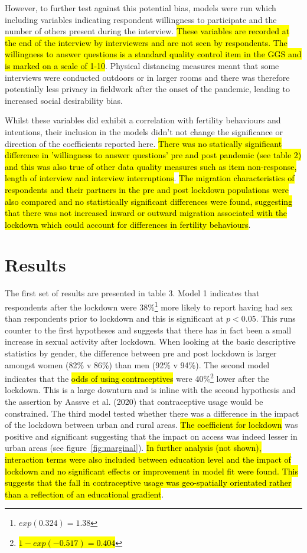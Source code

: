 \documentclass[10pt,letterpaper]{article}
\begin{document}
However, to further test against this potential bias, models were run which including variables indicating respondent willingness to participate and the number of others present during the interview. \hl{These variables are recorded at the end of the interview by interviewers and are not seen by respondents. The willingness to answer questions is a standard quality control item in the GGS and is marked on a scale of 1-10}. Physical distancing measures meant that some interviews were conducted outdoors or in larger rooms and there was therefore potentially less privacy in fieldwork after the onset of the pandemic, leading to increased social desirability bias. 

Whilst these variables did exhibit a correlation with fertility behaviours and intentions, their inclusion in the models didn't not change the significance or direction of the coefficients reported here. \hl{There was no statically significant difference in 'willingness to answer questions' pre and post pandemic (see table 2) and this was also true of other data quality measures such as item non-response, length of interview and interview interruptions}. \hl{The migration characteristics of respondents and their partners in the pre and post lockdown populations were also compared and no statistically significant differences were found, suggesting that there was not increased inward or outward migration associated with the lockdown which could account for differences in fertility behaviours}.
\newpage

\section*{Results} \label{sec:result}

The first set of results are presented in table 3. Model 1 indicates that respondents after the lockdown were 38\%\footnote{$exp(0.324) = 1.38$} more likely to report having had sex than respondents prior to lockdown and this is significant at $p < 0.05$. This runs counter to the first hypotheses and suggests that there has in fact been a small increase in sexual activity after lockdown. When looking at the basic descriptive statistics by gender, the difference between pre and post lockdown is larger amongst women (82\% v 86\%) than men (92\% v 94\%). 
The second model indicates that the \hl{odds of using contraceptives} were 40\%\footnote{\hl{$1 - exp(-0.517) = 0.404$}} lower after the lockdown. This is a large downturn and is inline with the second hypothesis and the assertion by Aassve et al. (2020) that contraceptive usage would be constrained. The third model tested whether there was a difference in the impact of the lockdown between urban and rural areas. \hl{The coefficient for lockdown} was positive and significant suggesting that the impact on access was indeed lesser in urban areas (see figure~\ref{fig:marginal}). \hl{In further analysis (not shown), interaction terms were also included between education level and the impact of lockdown and no significant effects or improvement in model fit were found. This suggests that the fall in contraceptive usage was geo-spatially orientated rather than a reflection of an educational gradient}.
\end{document}
